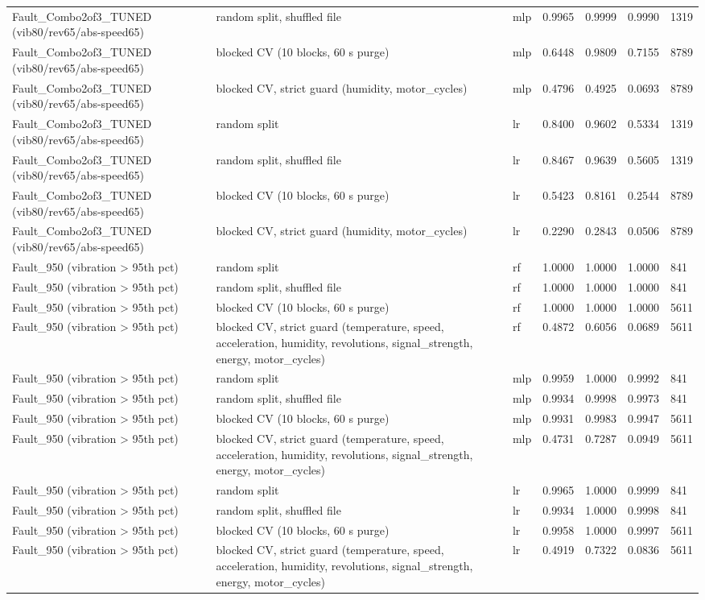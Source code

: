 \begin{tabular}{lllllll}
Fault\_Combo2of3\_TUNED (vib80/rev65/abs-speed65) & random split, shuffled file & mlp & 0.9965 & 0.9999 & 0.9990 & 1319 \\
Fault\_Combo2of3\_TUNED (vib80/rev65/abs-speed65) & blocked CV (10 blocks, 60 s purge) & mlp & 0.6448 & 0.9809 & 0.7155 & 8789 \\
Fault\_Combo2of3\_TUNED (vib80/rev65/abs-speed65) & blocked CV, strict guard (humidity, motor\_cycles) & mlp & 0.4796 & 0.4925 & 0.0693 & 8789 \\
Fault\_Combo2of3\_TUNED (vib80/rev65/abs-speed65) & random split & lr & 0.8400 & 0.9602 & 0.5334 & 1319 \\
Fault\_Combo2of3\_TUNED (vib80/rev65/abs-speed65) & random split, shuffled file & lr & 0.8467 & 0.9639 & 0.5605 & 1319 \\
Fault\_Combo2of3\_TUNED (vib80/rev65/abs-speed65) & blocked CV (10 blocks, 60 s purge) & lr & 0.5423 & 0.8161 & 0.2544 & 8789 \\
Fault\_Combo2of3\_TUNED (vib80/rev65/abs-speed65) & blocked CV, strict guard (humidity, motor\_cycles) & lr & 0.2290 & 0.2843 & 0.0506 & 8789 \\
Fault\_950 (vibration > 95th pct) & random split & rf & 1.0000 & 1.0000 & 1.0000 & 841 \\
Fault\_950 (vibration > 95th pct) & random split, shuffled file & rf & 1.0000 & 1.0000 & 1.0000 & 841 \\
Fault\_950 (vibration > 95th pct) & blocked CV (10 blocks, 60 s purge) & rf & 1.0000 & 1.0000 & 1.0000 & 5611 \\
Fault\_950 (vibration > 95th pct) & blocked CV, strict guard (temperature, speed, acceleration, humidity, revolutions, signal\_strength, energy, motor\_cycles) & rf & 0.4872 & 0.6056 & 0.0689 & 5611 \\
Fault\_950 (vibration > 95th pct) & random split & mlp & 0.9959 & 1.0000 & 0.9992 & 841 \\
Fault\_950 (vibration > 95th pct) & random split, shuffled file & mlp & 0.9934 & 0.9998 & 0.9973 & 841 \\
Fault\_950 (vibration > 95th pct) & blocked CV (10 blocks, 60 s purge) & mlp & 0.9931 & 0.9983 & 0.9947 & 5611 \\
Fault\_950 (vibration > 95th pct) & blocked CV, strict guard (temperature, speed, acceleration, humidity, revolutions, signal\_strength, energy, motor\_cycles) & mlp & 0.4731 & 0.7287 & 0.0949 & 5611 \\
Fault\_950 (vibration > 95th pct) & random split & lr & 0.9965 & 1.0000 & 0.9999 & 841 \\
Fault\_950 (vibration > 95th pct) & random split, shuffled file & lr & 0.9934 & 1.0000 & 0.9998 & 841 \\
Fault\_950 (vibration > 95th pct) & blocked CV (10 blocks, 60 s purge) & lr & 0.9958 & 1.0000 & 0.9997 & 5611 \\
Fault\_950 (vibration > 95th pct) & blocked CV, strict guard (temperature, speed, acceleration, humidity, revolutions, signal\_strength, energy, motor\_cycles) & lr & 0.4919 & 0.7322 & 0.0836 & 5611 \\
\bottomrule
\end{tabular}
